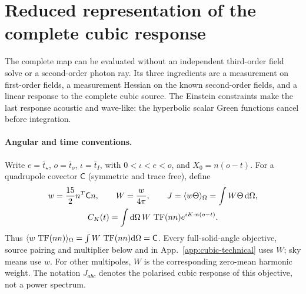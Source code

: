 \section{Reduced representation of the complete cubic response}\label{sec:stationary}
The complete map can be evaluated without an independent third-order field solve or a
second-order photon ray. Its three ingredients are a measurement on first-order fields,
a measurement Hessian on the known second-order fields, and a linear response to the
complete cubic source. The Einstein constraints make the last response acoustic and
wave-like: the hyperbolic scalar Green functions cancel before integration.

\paragraph{Angular and time conventions.}
Write $e=\bar t_\star$, $o=\bar t_o$, $\iota=\bar t_I$, with $0<\iota<e<o$, and
$X_0=n(o-t)$. For a quadrupole covector $\mathsf C$ (symmetric and trace free), define
\begin{equation}\label{eq:adjoint-weight-convention}
\begin{gathered}
 w=\frac{15}{2}n^T\mathsf Cn,\qquad W=\frac{w}{4\pi},\qquad
 J=\langle w\Theta\rangle_{\Omega}=\int W\Theta\,\mathrm{d}\Omega,\\
 C_K(t)=\int\mathrm{d}\Omega\,W\,\operatorname{TF}(nn)e^{iK\cdot n(o-t)}.
\end{gathered}
\end{equation}
Thus $\langle w\,\operatorname{TF}(nn)\rangle_{\Omega}=\int W\,\operatorname{TF}(nn)\mathrm{d}\Omega=\mathsf C$.
Every full-solid-angle objective, source pairing and multiplier below and in
App.~\ref{app:cubic-technical} uses $W$; sky means use $w$. For other multipoles,
$W$ is the corresponding zero-mean harmonic weight. The notation $J_{abc}$ denotes
the polarised cubic response of this objective, not a power spectrum.

